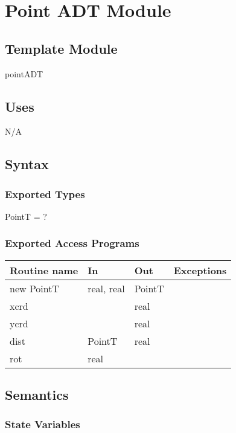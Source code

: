 \documentclass[12pt,fleqn]{article}
\begin{document}
\newpage

\section* {Point ADT Module}

\subsection*{Template Module}

pointADT

\subsection* {Uses}

N/A

\subsection* {Syntax}

\subsubsection* {Exported Types}

PointT = ?

\subsubsection* {Exported Access Programs}

\begin{tabular}{| l | l | l | l |}
\hline
\textbf{Routine name} & \textbf{In} & \textbf{Out} & \textbf{Exceptions}\\
\hline
new PointT & real, real & PointT & ~\\
\hline
xcrd & ~ & real & ~\\
\hline
ycrd & ~ & real & ~\\
\hline
dist & PointT & real & ~\\
\hline
rot & real & ~ & ~\\
\hline

\end{tabular}

\subsection* {Semantics}

\subsubsection* {State Variables}
\end{document}

